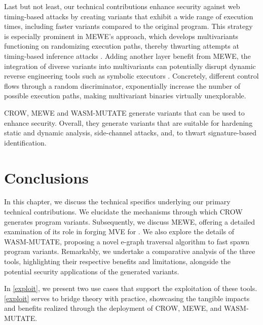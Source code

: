 Last but not least, our technical contributions enhance security against web timing-based attacks \cite{morgan2015web} by creating variants that exhibit a wide range of execution times, including faster variants compared to the original program. 
This strategy is especially prominent in MEWE’s approach, which develops multivariants functioning on randomizing execution paths, thereby thwarting attempts at timing-based inference attacks \cite{DBLP:conf/ndss/SchnitzlerKBP23}. 
Adding another layer benefit from MEWE, the integration of diverse variants into multivariants can potentially disrupt dynamic reverse engineering tools such as symbolic executors \cite{wasmixer}. 
Concretely, different control flows through a random discriminator, exponentially increase the number of possible execution paths, making multivariant binaries virtually unexplorable.


\begin{tcolorbox}[title=Takeaway,boxrule=1pt,arc=.2em,boxsep=1.0mm]
    CROW, MEWE and WASM-MUTATE generate \Wasm variants that can be used to enhance security. 
    Overall, they generate variants that are suitable for hardening static and dynamic analysis, side-channel attacks, and, to thwart signature-based identification. 
\end{tcolorbox}


\section*{Conclusions}

In this chapter, we discuss the technical specifics underlying our primary technical contributions.
We elucidate the mechanisms through which CROW generates program variants.
Subsequently, we discuss MEWE, offering a detailed examination of its role in forging MVE for \Wasm. 
We also explore the details of WASM-MUTATE, proposing a novel e-graph traversal algorithm to fast spawn \wasm program variants. 
Remarkably, we undertake a comparative analysis of the three tools, highlighting their respective benefits and limitations, alongside the potential security applications of the generated \wasm variants. 

In \autoref{exploit}, we present two use cases that support the exploitation of these tools.
\autoref{exploit} serves to bridge theory with practice, showcasing the tangible impacts and benefits realized through the deployment of CROW, MEWE, and WASM-MUTATE.
